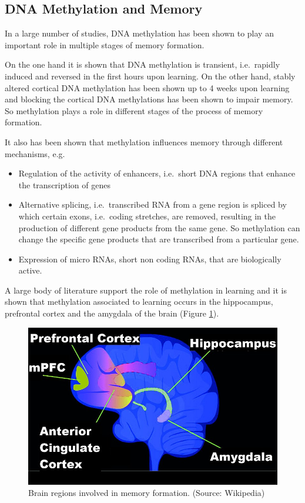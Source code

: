 \documentclass[
  11pt,
]{book}
\providecommand{\tightlist}{%
  \setlength{\itemsep}{0pt}\setlength{\parskip}{0pt}}
\begin{document}
\hypertarget{dna-methylation-and-memory}{%
\subsection{DNA Methylation and Memory}\label{dna-methylation-and-memory}}

In a large number of studies, DNA methylation has been shown to play an important role in multiple stages of memory formation.

On the one hand it is shown that DNA methylation is transient, i.e.~rapidly induced and reversed in the first hours upon learning. On the other hand, stably altered cortical DNA methylation has been shown up to 4 weeks upon learning and blocking the cortical DNA methylations has been shown to impair memory.
So methylation plays a role in different stages of the process of memory formation.

It also has been shown that methylation influences memory through different mechanisms, e.g.~

\begin{itemize}
\tightlist
\item
  Regulation of the activity of enhancers, i.e.~short DNA regions that enhance the transcription of genes
\item
  Alternative splicing, i.e.~transcribed RNA from a gene region is spliced by which certain exons, i.e.~coding stretches, are removed, resulting in the production of different gene products from the same gene. So methylation can change the specific gene products that are transcribed from a particular gene.
\item
  Expression of micro RNAs, short non coding RNAs, that are biologically active.
\end{itemize}

A large body of literature support the role of methylation in learning and it is shown that methylation associated to learning occurs in the hippocampus, prefrontal cortex and the amygdala of the brain (Figure \ref{fig:brainRegionsLearning}).

\begin{figure}

{\centering \includegraphics[width=0.5\linewidth]{./figs/Brain_regions_in_memory_formation} 

}

\caption{Brain regions involved in memory formation. (Source: Wikipedia)}\label{fig:brainRegionsLearning}
\end{figure}
\end{document}
